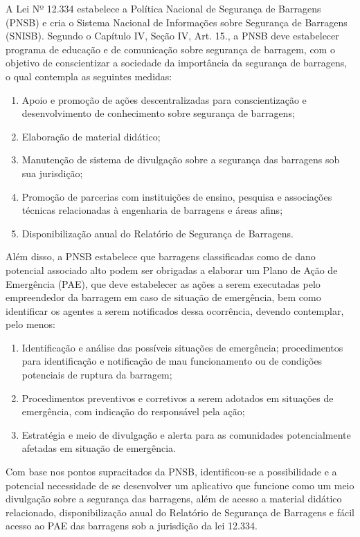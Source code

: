 \documentclass[12pt]{article}
\begin{document}
A Lei Nº 12.334 \cite{leiPNSB} estabelece a Política Nacional de Segurança de Barragens (PNSB) e cria o Sistema Nacional de Informações sobre Segurança de Barragens (SNISB). Segundo o Capítulo IV, Seção IV, Art. 15., a PNSB deve estabelecer programa de educação e de comunicação sobre segurança de barragem, com o objetivo de conscientizar a sociedade da importância da segurança de barragens, o qual contempla as seguintes medidas:

\begin{enumerate}
    \item Apoio e promoção de ações descentralizadas para conscientização e desenvolvimento de conhecimento sobre segurança de barragens;
    \item Elaboração de material didático;
    \item Manutenção de sistema de divulgação sobre a segurança das barragens sob sua jurisdição;
    \item Promoção de parcerias com instituições de ensino, pesquisa e associações técnicas relacionadas à engenharia de barragens e áreas afins;
    \item Disponibilização anual do Relatório de Segurança de Barragens.
\end{enumerate}

Além disso, a PNSB estabelece que barragens classificadas como de dano potencial associado alto podem ser obrigadas a elaborar um Plano de Ação de Emergência (PAE), que deve estabelecer as ações a serem executadas pelo empreendedor da barragem em caso de situação de emergência, bem como identificar os agentes a serem notificados dessa ocorrência, devendo contemplar, pelo menos:

\begin{enumerate}
    \item Identificação e análise das possíveis situações de emergência;
procedimentos para identificação e notificação de mau funcionamento ou de condições potenciais de ruptura da barragem;
    \item Procedimentos preventivos e corretivos a serem adotados em situações de emergência, com indicação do responsável pela ação;
    \item Estratégia e meio de divulgação e alerta para as comunidades potencialmente afetadas em situação de emergência.
\end{enumerate}

Com base nos pontos supracitados da PNSB, identificou-se a possibilidade e a potencial necessidade de se desenvolver um aplicativo que funcione como um meio divulgação sobre a segurança das barragens, além de acesso a material didático relacionado, disponibilização anual do Relatório de Segurança de Barragens e fácil acesso ao PAE das barragens sob a jurisdição da lei 12.334.
\end{document}
